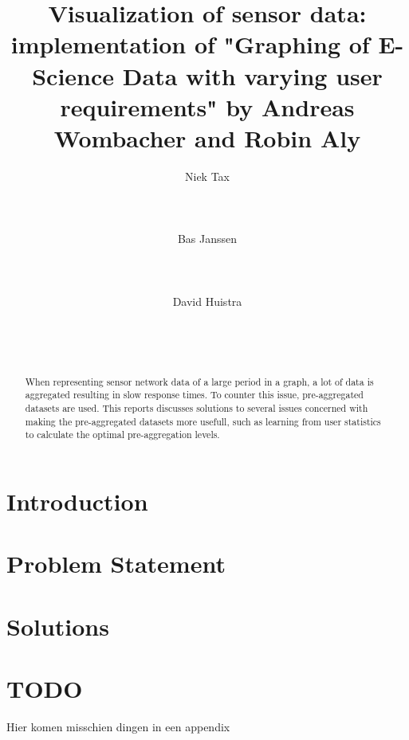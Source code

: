 \documentclass{sig-alternate-br}
\begin{document}

\title{Visualization of sensor data: implementation of "Graphing of E-Science Data with varying user requirements" by Andreas Wombacher and Robin Aly}

\author{
\alignauthor Niek Tax\\
       \\
       \\
       \\
\alignauthor Bas Janssen\\
       \\
       \\
       \\
\alignauthor David Huistra\\
              \\
              \\
              \\
}

\maketitle
\begin{abstract}
When representing sensor network data of a large period in a graph, a lot of data is aggregated resulting in slow response times. To counter this issue, pre-aggregated
datasets are used. This reports discusses solutions to several issues concerned with making the pre-aggregated datasets more usefull, such as learning from user statistics to calculate the optimal pre-aggregation levels.
\end{abstract} 


\section{Introduction}

\section{Problem Statement}

\section{Solutions}

%




\balancecolumns

\onecolumn
\appendix

\section{TODO}
Hier komen misschien dingen in een appendix
\end{document}
